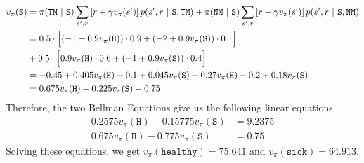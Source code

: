 \documentclass[11pt]{article}
\begin{document}
    \begin{align*}
        v_{\pi}(\texttt{S}) &= \pi(\texttt{TM} \ | \ \texttt{S}) \sum_{s', r} \left[ r + \gamma v_{\pi}(s') \right] p(s', r \ | \ \texttt{S}, \texttt{TM})
        + \pi(\texttt{NM} \ | \ \texttt{S}) \sum_{s', r} \left[ r + \gamma v_{\pi}(s') \right] p(s', r \ | \ \texttt{S}, \texttt{NM}) \\
        &= 0.5 \cdot \Big{[} (-1 + 0.9 v_{\pi}(\texttt{H})) \cdot 0.9 + (-2 + 0.9 v_{\pi}(\texttt{S})) \cdot 0.1 \Big{]} \\
        &+ 0.5 \cdot \Big{[} 0.9 v_{\pi}(\texttt{H}) \cdot 0.6 + (-1 + 0.9 v_{\pi}(\texttt{S})) \cdot 0.4 \Big{]} \\
        &= -0.45 + 0.405 v_{\pi}(\texttt{H}) - 0.1 + 0.045 v_{\pi}(\texttt{S}) + 0.27 v_{\pi}(\texttt{H}) - 0.2 + 0.18 v_{\pi}(\texttt{S}) \\
        &=0.675 v_{\pi}(\texttt{H}) + 0.225 v_{\pi}(\texttt{S}) - 0.75
    \end{align*}
    Therefore, the two Bellman Equations give us the following linear equations
    \begin{align*}
        0.2575 v_{\pi}(\texttt{H}) - 0.15775 v_{\pi}(\texttt{S}) &= 9.2375 \\
        0.675 v_{\pi}(\texttt{H}) - 0.775 v_{\pi}(\texttt{S}) &= 0.75
    \end{align*}
    Solving these equations, we get $v_{\pi}(\texttt{healthy}) = 75.641$ and $v_{\pi}(\texttt{sick}) = 64.913$.
\end{document}
